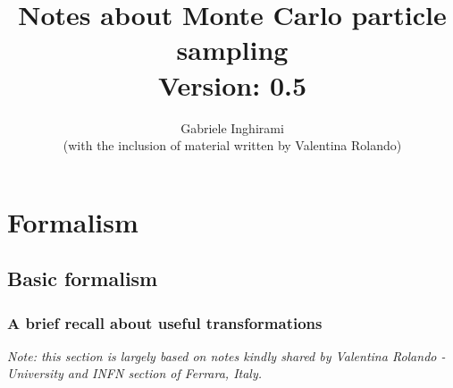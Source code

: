 \documentclass[12pt, a4paper]{report}
\begin{document}
	\title{Notes about Monte Carlo particle sampling\\\vspace*{1cm}\small{Version: 0.5}}
\author{Gabriele Inghirami\\\footnotesize{(with the inclusion of material written by Valentina Rolando)}}
\maketitle
\tableofcontents

\chapter{Formalism}
\section{Basic formalism}
\subsection{A brief recall about useful transformations}
\emph{Note: this section is largely based on notes kindly shared by Valentina Rolando - University and INFN section of Ferrara, Italy.}\\
\end{document}
